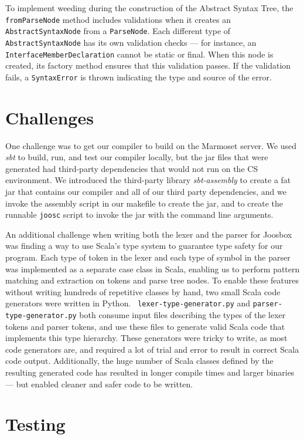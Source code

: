 \documentclass[letterpaper]{article}
\begin{document}
  To implement weeding during the construction of the Abstract Syntax Tree, the
  {\tt fromParseNode} method includes validations when it creates an {\tt
  AbstractSyntaxNode} from a {\tt ParseNode}. Each different type of {\tt
  AbstractSyntaxNode}  has its own validation checks --- for instance, an {\tt
  InterfaceMemberDeclaration} cannot be static  or final. When this node is
  created, its factory method ensures that this validation passes. If the
  validation  fails, a {\tt SyntaxError} is thrown indicating the type and
  source of the error.

  \section{Challenges}

  One challenge was to get our compiler to build on the Marmoset server. We used
  {\em sbt} to build, run, and test our compiler locally, but the jar files that
  were generated had third-party dependencies that would not run on the CS
  environment. We introduced the third-party library {\em sbt-assembly} to
  create a fat jar that contains our compiler and all of our third party
  dependencies, and we invoke the assembly script in our makefile to create the
  jar, and to create the runnable {\tt joosc} script to invoke the jar with the
  command line arguments.

  An additional challenge when writing both the lexer and the parser for Joosbox
  was finding a way to use Scala's type system to guarantee type safety for our
  program. Each type of token in the lexer and each type of symbol in the parser
  was implemented as a separate case class in Scala, enabling us to perform
  pattern matching and extraction on tokens and parse tree nodes. To enable
  these features without writing hundreds of repetitive classes by hand, two
  small Scala code generators were written in Python.  {\tt
  lexer-type-generator.py} and {\tt parser-type-generator.py} both consume input
  files describing the types of the lexer tokens and parser tokens, and use
  these files to generate valid Scala code that implements this type hierarchy.
  These generators were tricky to write, as most code generators are, and
  required a lot of trial and error to result in correct Scala code output.
  Additionally, the huge number of Scala classes defined by the resulting
  generated code has resulted in longer compile times and larger binaries ---
  but enabled cleaner and safer code to be written.

  \section{Testing}
\end{document}
